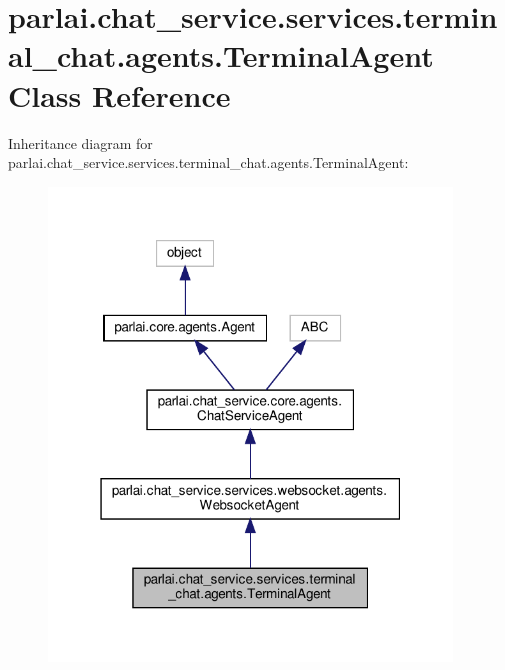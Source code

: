 \hypertarget{classparlai_1_1chat__service_1_1services_1_1terminal__chat_1_1agents_1_1TerminalAgent}{}\section{parlai.\+chat\+\_\+service.\+services.\+terminal\+\_\+chat.\+agents.\+Terminal\+Agent Class Reference}
\label{classparlai_1_1chat__service_1_1services_1_1terminal__chat_1_1agents_1_1TerminalAgent}


Inheritance diagram for parlai.\+chat\+\_\+service.\+services.\+terminal\+\_\+chat.\+agents.\+Terminal\+Agent\+:\nopagebreak
\begin{figure}[H]
\begin{center}
\leavevmode
\includegraphics[width=304pt]{d8/d30/classparlai_1_1chat__service_1_1services_1_1terminal__chat_1_1agents_1_1TerminalAgent__inherit__graph}
\end{center}
\end{figure}



